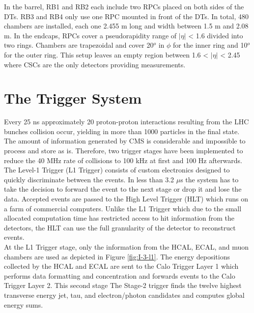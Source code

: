       In the barrel, RB1 and RB2 each include two RPCs placed on both sides of the DTs. RB3 and RB4 only use one RPC mounted in front of the DTs. In total, 480 chambers are installed, each one 2.455 m long and width between 1.5 m and 2.08 m. In the endcaps, RPCs cover a pseudorapidity range of $ | \eta | $ < 1.6 divided into two rings. Chambers are trapezoidal and cover 20$^o$ in $ \phi $ for the inner ring and 10$^o$ for the outer ring. This setup leaves an empty region between 1.6 < $ | \eta | $ < 2.45 where CSCs are the only detectors providing measurements.

  \section{The Trigger System}

    Every 25 ns approximately 20 proton-proton interactions resulting from the LHC bunches collision occur, yielding in more than 1000 particles in the final state. The amount of information generated by CMS is considerable and impossible to process and store as is. Therefore, two trigger stages have been implemented to reduce the 40 MHz rate of collisions to 100 kHz at first and 100 Hz afterwards. The Level-1 Trigger (L1 Trigger) consists of custom electronics designed to quickly discriminate between the events. In less than 3.2 $\mu$s the system has to take the decision to forward the event to the next stage or drop it and lose the data. Accepted events are passed to the High Level Trigger (HLT) which runs on a farm of commercial computers. Unlike the L1 Trigger which due to the small allocated computation time has restricted access to hit information from the detectors, the HLT can use the full granularity of the detector to reconstruct events. \\

    At the L1 Trigger stage, only the information from the HCAL, ECAL, and muon chambers are used as depicted in Figure \ref{fig:I-3-l1}. The energy depositions collected by the HCAL and ECAL are sent to the Calo Trigger Layer 1 which performs data formatting and concentration and forwards events to the Calo Trigger Layer 2. This second stage The Stage-2 trigger finds the twelve highest transverse energy jet, tau, and electron/photon candidates and computes global energy sums. \\

